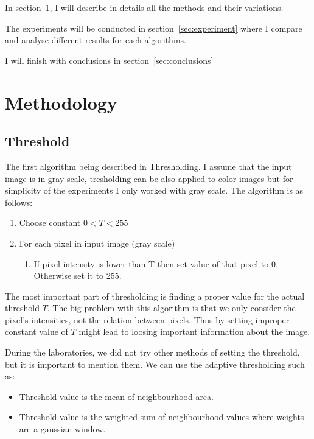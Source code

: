 \documentclass{article}
\begin{document}
In section~\ref{sec:methodology}, I will describe in details all the methods and their variations.

The experiments will be conducted in section~\ref{sec:experiment} where I compare and analyse different results for each algorithms.

I will finish with conclusions in section~\ref{sec:conclusions}


\section{Methodology}
\label{sec:methodology}


\subsection{Threshold}
The first algorithm being described in Thresholding.
I assume that the input image is in gray scale, tresholding can be also applied to color images but for simplicity of the experiments I only worked with gray scale.
The algorithm is as follows:
\begin{enumerate}
	\item Choose constant $0 < T < 255$
	\item For each pixel in input image (gray scale)
	\begin{enumerate}
		\item If pixel intensity is lower than T
		then set value of that pixel to 0. \\
		Otherwise set it to 255.
	\end{enumerate}
\end{enumerate}

The most important part of thresholding is finding a proper value for the actual threshold $T$.
The big problem with this algorithm is that we only consider the pixel's intensities, not the relation between pixels.
Thus by setting improper constant value of $T$ might lead to loosing important information about the image.

During the laboratories, we did not try other methods of setting the threshold, but it is important to mention them.
We can use the adaptive thresholding such as:
\begin{itemize}
	\item Threshold value is the mean of neighbourhood area.
	
	\item  Threshold value is the weighted sum of neighbourhood values 					where weights are a gaussian window.		
\end{itemize}
\end{document}
